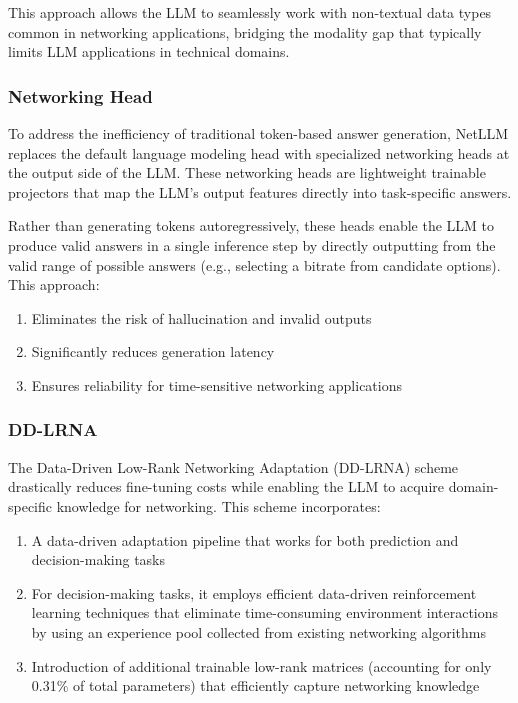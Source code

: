 \documentclass[twocolumn]{article}
\begin{document}
This approach allows the LLM to seamlessly work with non-textual data types common in networking applications, bridging the modality gap that typically limits LLM applications in technical domains.

\subsubsection{Networking Head}
To address the inefficiency of traditional token-based answer generation, NetLLM replaces the default language modeling head with specialized networking heads at the output side of the LLM. These networking heads are lightweight trainable projectors that map the LLM's output features directly into task-specific answers.

Rather than generating tokens autoregressively, these heads enable the LLM to produce valid answers in a single inference step by directly outputting from the valid range of possible answers (e.g., selecting a bitrate from candidate options). This approach:

\begin{enumerate}[itemsep=0pt, topsep=2pt, parsep=0pt]
  \item Eliminates the risk of hallucination and invalid outputs
  \item Significantly reduces generation latency
  \item Ensures reliability for time-sensitive networking applications
\end{enumerate}

\subsubsection{DD-LRNA}
The Data-Driven Low-Rank Networking Adaptation (DD-LRNA) scheme drastically reduces fine-tuning costs while enabling the LLM to acquire domain-specific knowledge for networking. This scheme incorporates:

\begin{enumerate}[itemsep=0pt, topsep=2pt, parsep=0pt]
  \item A data-driven adaptation pipeline that works for both prediction and decision-making tasks
  \item For decision-making tasks, it employs efficient data-driven reinforcement learning techniques that eliminate time-consuming environment interactions by using an experience pool collected from existing networking algorithms
  \item Introduction of additional trainable low-rank matrices (accounting for only 0.31\% of total parameters) that efficiently capture networking knowledge
\end{enumerate}
\end{document}
